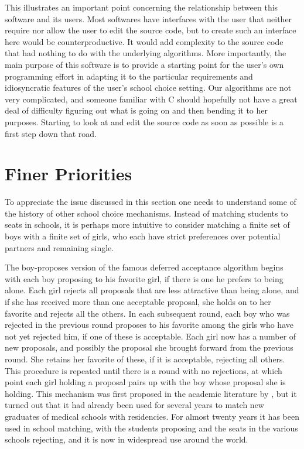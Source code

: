 \documentclass[12pt]{article}
\theoremstyle{definition}
\begin{document}
This illustrates an important point concerning the relationship
between this software and its users.  Most softwares have interfaces
with the user that neither require nor allow the user to edit the
source code, but to create such an interface here would be
counterproductive. It would add complexity to the source code that had
nothing to do with the underlying algorithms.  More importantly, the
main purpose of this software is to provide a starting point for the
user's own programming effort in adapting it to the particular
requirements and idiosyncratic features of the user's school choice
setting.  Our algorithms are not very complicated, and someone
familiar with C should hopefully not have a great deal of difficulty
figuring out what is going on and then bending it to her purposes.
Starting to look at and edit the source code as soon as possible is a
first step down that road.


\section{Finer Priorities} \label{sec:Priorities}

To appreciate the issue discussed in this section one needs to
understand some of the history of other school choice mechanisms.
Instead of matching students to seats in schools, it is perhaps more
intuitive to consider matching a finite set of boys with a finite set
of girls, who each have strict preferences over potential partners and
remaining single.

The boy-proposes version of the famous deferred acceptance algorithm
begins with each boy proposing to his favorite girl, if there is one
he prefers to being alone.  Each girl rejects all proposals that are
less attractive than being alone, and if she has received more than
one acceptable proposal, she holds on to her favorite and rejects all
the others.  In each subsequent round, each boy who was rejected in
the previous round proposes to his favorite among the girls who have
not yet rejected him, if one of these is acceptable. Each girl now has
a number of new proposals, and possibly the proposal she brought
forward from the previous round.  She retains her favorite of these,
if it is acceptable, rejecting all others.  This procedure is repeated
until there is a round with no rejections, at which point each girl
holding a proposal pairs up with the boy whose proposal she is
holding. This mechanism was first proposed in the academic literature
by \cite{GaSh62}, but it turned out that it had already been used for
several years to match new graduates of medical schools with
residencies.  For almost twenty years it has been used in school
matching, with the students proposing and the seats in the various
schools rejecting, and it is now in widespread use around the world.
\end{document}
